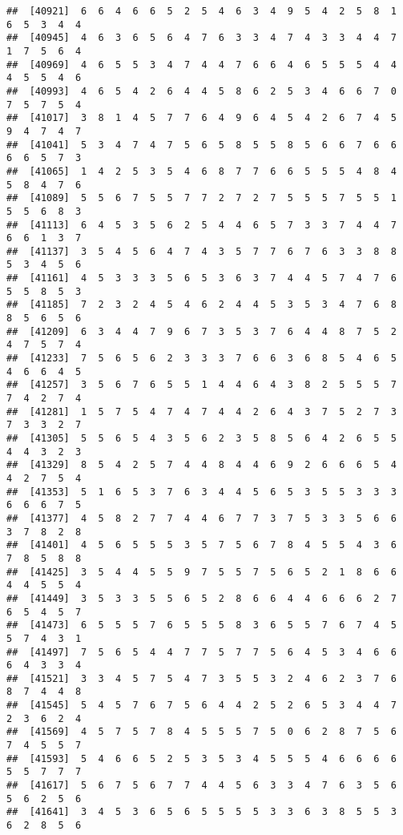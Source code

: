 \documentclass[
]{book}
\begin{document}
\begin{verbatim}
##  [40921]  6  6  4  6  6  5  2  5  4  6  3  4  9  5  4  2  5  8  1  6  5  3  4  4
##  [40945]  4  6  3  6  5  6  4  7  6  3  3  4  7  4  3  3  4  4  7  1  7  5  6  4
##  [40969]  4  6  5  5  3  4  7  4  4  7  6  6  4  6  5  5  5  4  4  4  5  5  4  6
##  [40993]  4  6  5  4  2  6  4  4  5  8  6  2  5  3  4  6  6  7  0  7  5  7  5  4
##  [41017]  3  8  1  4  5  7  7  6  4  9  6  4  5  4  2  6  7  4  5  9  4  7  4  7
##  [41041]  5  3  4  7  4  7  5  6  5  8  5  5  8  5  6  6  7  6  6  6  6  5  7  3
##  [41065]  1  4  2  5  3  5  4  6  8  7  7  6  6  5  5  5  4  8  4  5  8  4  7  6
##  [41089]  5  5  6  7  5  5  7  7  2  7  2  7  5  5  5  7  5  5  1  5  5  6  8  3
##  [41113]  6  4  5  3  5  6  2  5  4  4  6  5  7  3  3  7  4  4  7  6  6  1  3  7
##  [41137]  3  5  4  5  6  4  7  4  3  5  7  7  6  7  6  3  3  8  8  5  3  4  5  6
##  [41161]  4  5  3  3  3  5  6  5  3  6  3  7  4  4  5  7  4  7  6  5  5  8  5  3
##  [41185]  7  2  3  2  4  5  4  6  2  4  4  5  3  5  3  4  7  6  8  8  5  6  5  6
##  [41209]  6  3  4  4  7  9  6  7  3  5  3  7  6  4  4  8  7  5  2  4  7  5  7  4
##  [41233]  7  5  6  5  6  2  3  3  3  7  6  6  3  6  8  5  4  6  5  4  6  6  4  5
##  [41257]  3  5  6  7  6  5  5  1  4  4  6  4  3  8  2  5  5  5  7  7  4  2  7  4
##  [41281]  1  5  7  5  4  7  4  7  4  4  2  6  4  3  7  5  2  7  3  7  3  3  2  7
##  [41305]  5  5  6  5  4  3  5  6  2  3  5  8  5  6  4  2  6  5  5  4  4  3  2  3
##  [41329]  8  5  4  2  5  7  4  4  8  4  4  6  9  2  6  6  6  5  4  4  2  7  5  4
##  [41353]  5  1  6  5  3  7  6  3  4  4  5  6  5  3  5  5  3  3  3  6  6  6  7  5
##  [41377]  4  5  8  2  7  7  4  4  6  7  7  3  7  5  3  3  5  6  6  3  7  8  2  8
##  [41401]  4  5  6  5  5  5  3  5  7  5  6  7  8  4  5  5  4  3  6  7  8  5  8  8
##  [41425]  3  5  4  4  5  5  9  7  5  5  7  5  6  5  2  1  8  6  6  4  4  5  5  4
##  [41449]  3  5  3  3  5  5  6  5  2  8  6  6  4  4  6  6  6  2  7  6  5  4  5  7
##  [41473]  6  5  5  5  7  6  5  5  5  8  3  6  5  5  7  6  7  4  5  5  7  4  3  1
##  [41497]  7  5  6  5  4  4  7  7  5  7  7  5  6  4  5  3  4  6  6  6  4  3  3  4
##  [41521]  3  3  4  5  7  5  4  7  3  5  5  3  2  4  6  2  3  7  6  8  7  4  4  8
##  [41545]  5  4  5  7  6  7  5  6  4  4  2  5  2  6  5  3  4  4  7  2  3  6  2  4
##  [41569]  4  5  7  5  7  8  4  5  5  5  7  5  0  6  2  8  7  5  6  7  4  5  5  7
##  [41593]  5  4  6  6  5  2  5  3  5  3  4  5  5  5  4  6  6  6  6  5  5  7  7  7
##  [41617]  5  6  7  5  6  7  7  4  4  5  6  3  3  4  7  6  3  5  6  5  6  2  5  6
##  [41641]  3  4  5  3  6  5  6  5  5  5  5  3  3  6  3  8  5  5  3  6  2  8  5  6

\end{verbatim}
\end{document}
